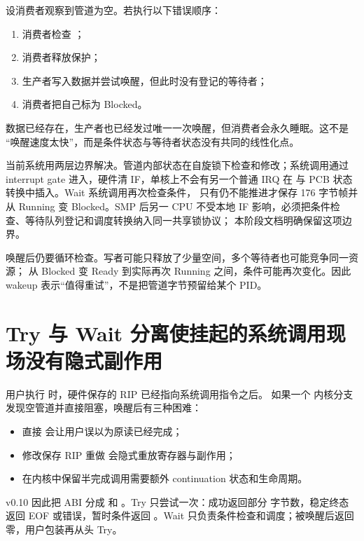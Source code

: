 设消费者观察到管道为空。若执行以下错误顺序：

\begin{enumerate}[label=\arabic*.]
  \item 消费者检查 ；
  \item 消费者释放保护；
  \item 生产者写入数据并尝试唤醒，但此时没有登记的等待者；
  \item 消费者把自己标为 Blocked。
\end{enumerate}

数据已经存在，生产者也已经发过唯一一次唤醒，但消费者会永久睡眠。这不是
“唤醒速度太快”，而是条件状态与等待者状态没有共同的线性化点。

当前系统用两层边界解决。管道内部状态在自旋锁下检查和修改；系统调用通过
interrupt gate 进入，硬件清 IF，单核上不会有另一个普通 IRQ 在
 与 PCB 状态转换中插入。Wait 系统调用再次检查条件，
只有仍不能推进才保存 176 字节帧并从 Running 变 Blocked。SMP 后另一 CPU
不受本地 IF 影响，必须把条件检查、等待队列登记和调度转换纳入同一共享锁协议；
本阶段文档明确保留这项边界。

唤醒后仍要循环检查。写者可能只释放了少量空间，多个等待者也可能竞争同一资源；
从 Blocked 变 Ready 到实际再次 Running 之间，条件可能再次变化。因此 wakeup
表示“值得重试”，不是把管道字节预留给某个 PID。

\section{Try 与 Wait 分离使挂起的系统调用现场没有隐式副作用}

用户执行  时，硬件保存的 RIP 已经指向系统调用指令之后。
如果一个  内核分支发现空管道并直接阻塞，唤醒后有三种困难：

\begin{itemize}
  \item 直接  会让用户误以为原读已经完成；
  \item 修改保存 RIP 重做  会隐式重放寄存器与副作用；
  \item 在内核中保留半完成调用需要额外 continuation 状态和生命周期。
\end{itemize}

v0.10 因此把 ABI 分成  和
。Try 只尝试一次：成功返回部分
字节数，稳定终态返回 EOF 或错误，暂时条件返回 。Wait
只负责条件检查和调度；被唤醒后返回零，用户包装再从头 Try。


